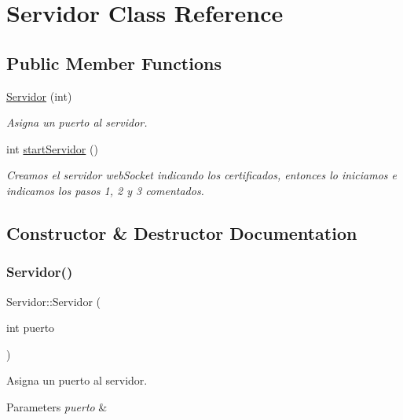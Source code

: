 \hypertarget{classServidor}{}\section{Servidor Class Reference}
\label{classServidor}
\subsection*{Public Member Functions}
\begin{DoxyCompactItemize}
\item 
\mbox{\hyperlink{classServidor_ab62fda340e2085f8269b8e04417a90c9}{Servidor}} (int)
\begin{DoxyCompactList}\small\item\em Asigna un puerto al servidor. \end{DoxyCompactList}\item 
int \mbox{\hyperlink{classServidor_a43733f2069b63eb58edcbb61fa6a63ec}{start\+Servidor}} ()
\begin{DoxyCompactList}\small\item\em Creamos el servidor web\+Socket indicando los certificados, entonces lo iniciamos e indicamos los pasos 1, 2 y 3 comentados. \end{DoxyCompactList}\end{DoxyCompactItemize}


\subsection{Constructor \& Destructor Documentation}
\mbox{\label{classServidor_ab62fda340e2085f8269b8e04417a90c9}} 
\subsubsection{\texorpdfstring{Servidor()}{Servidor()}}
{\footnotesize\ttfamily Servidor\+::\+Servidor (\begin{DoxyParamCaption}\item[{int}]{puerto }\end{DoxyParamCaption})}



Asigna un puerto al servidor. 


\begin{DoxyParams}{Parameters}
{\em puerto} & \\
\hline
\end{DoxyParams}



